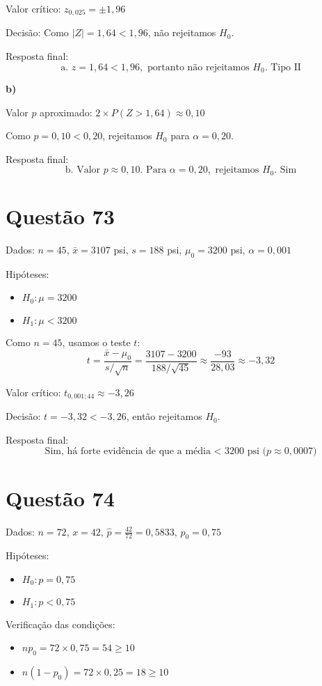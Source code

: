 \documentclass[12pt]{article}
\newcommand{\quest}[1]{\section*{Questão #1}} %
\begin{document}
Valor crítico: $z_{0{,}025} = \pm 1{,}96$

Decisão: Como $|Z| = 1{,}64 < 1{,}96$, não rejeitamos $H_0$.

Resposta final:
\[
\boxed{\text{a. } z = 1{,}64 < 1{,}96, \text{ portanto não rejeitamos } H_0. \text{ Tipo II}}
\]

\textbf{b)}

Valor $p$ aproximado: $2 \times P(Z > 1{,}64) \approx 0{,}10$

Como $p = 0{,}10 < 0{,}20$, rejeitamos $H_0$ para $\alpha = 0{,}20$.

Resposta final:
\[
\boxed{\text{b. Valor } p \approx 0{,}10. \text{ Para } \alpha = 0{,}20, \text{ rejeitamos } H_0. \text{ Sim}}
\]

\quest{73}

Dados: $n = 45$, $\bar{x} = 3107$ psi, $s = 188$ psi, $\mu_0 = 3200$ psi, $\alpha = 0{,}001$

Hipóteses:
\begin{itemize}
  \item $H_0: \mu = 3200$
  \item $H_1: \mu < 3200$
\end{itemize}

Como $n = 45$, usamos o teste $t$:
\[
t = \frac{\bar{x} - \mu_0}{s / \sqrt{n}} = \frac{3107 - 3200}{188 / \sqrt{45}} \approx \frac{-93}{28{,}03} \approx -3{,}32
\]

Valor crítico: $t_{0{,}001; 44} \approx -3{,}26$

Decisão: $t = -3{,}32 < -3{,}26$, então rejeitamos $H_0$.

Resposta final:
\[
\boxed{\text{Sim, h\'a forte evid\^encia de que a m\'edia < 3200 psi ($p \approx 0{,}0007$)}}
\]

\quest{74}

Dados: $n = 72$, $x = 42$, $\hat{p} = \frac{42}{72} = 0{,}5833$, $p_0 = 0{,}75$

Hipóteses:
\begin{itemize}
  \item $H_0: p = 0{,}75$
  \item $H_1: p < 0{,}75$
\end{itemize}

Verificação das condições:
\begin{itemize}
  \item $np_0 = 72 \times 0{,}75 = 54 \geq 10$
  \item $n(1 - p_0) = 72 \times 0{,}25 = 18 \geq 10$
\end{itemize}
\end{document}
